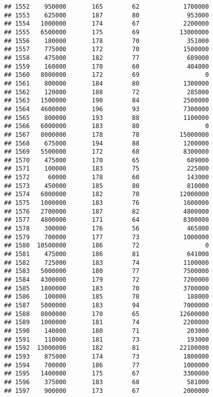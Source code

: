 \documentclass[
]{article}
\begin{document}
\begin{verbatim}
## 1552    950000       165        62            1700000
## 1553    625000       187        80             953000
## 1554   1000000       174        67            2200000
## 1555   6500000       175        69           13000000
## 1556    180000       178        70             351000
## 1557    775000       172        70            1500000
## 1558    475000       182        77             689000
## 1559    160000       170        60             404000
## 1560   8000000       172        69                  0
## 1561    800000       184        80            1300000
## 1562    120000       188        72             285000
## 1563   1500000       190        84            2500000
## 1564   4600000       196        93            7300000
## 1565    800000       193        88            1100000
## 1566   6000000       183        80                  0
## 1567   8000000       178        78           15000000
## 1568    675000       194        88            1200000
## 1569   5500000       172        68            8300000
## 1570    475000       170        65             689000
## 1571    100000       183        75             225000
## 1572     60000       178        60             143000
## 1573    450000       185        80             810000
## 1574   6000000       182        70           12000000
## 1575   1000000       183        76            1600000
## 1576   2700000       187        82            4800000
## 1577   4800000       171        64            8300000
## 1578    300000       176        56             465000
## 1579    700000       177        73            1000000
## 1580  10500000       186        72                  0
## 1581    475000       186        81             641000
## 1582    725000       183        74            1100000
## 1583   5000000       180        77            7500000
## 1584   4300000       179        72            7200000
## 1585   1800000       183        70            3700000
## 1586    100000       185        78             188000
## 1587   5000000       183        94            7000000
## 1588   8000000       170        65           12600000
## 1589   1000000       181        74            2200000
## 1590    140000       180        71             203000
## 1591    110000       181        73             193000
## 1592  13000000       182        81           22100000
## 1593    875000       174        73            1800000
## 1594    700000       186        77            1000000
## 1595   1400000       175        67            3300000
## 1596    375000       183        68             581000
## 1597    900000       173        67            2000000

\end{verbatim}
\end{document}
